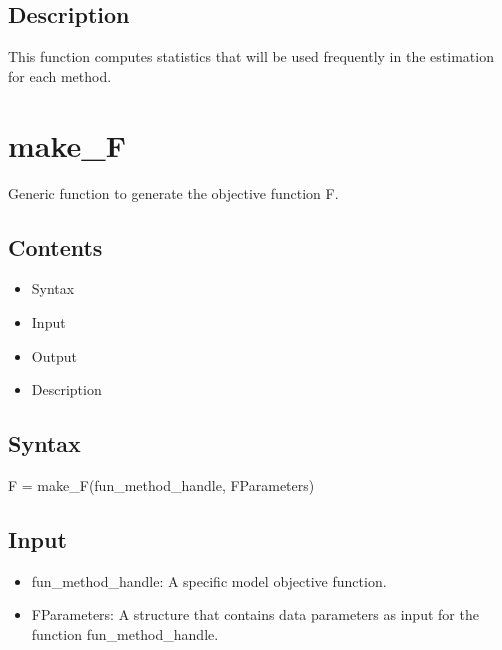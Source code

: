 \documentclass[a4paper,11pt,openany]{memoir}
\begin{document}
\subsection*{Description}

\begin{par}
This function computes statistics that will be used frequently in the estimation for each method.
\end{par} \vspace{1em}

\newpage

\section*{make\_F}

\begin{par}
Generic function to generate the objective function F.
\end{par} \vspace{1em}

\subsection*{Contents}

\begin{itemize}
\setlength{\itemsep}{-1ex}
   \item Syntax
   \item Input
   \item Output
   \item Description
\end{itemize}


\subsection*{Syntax}

\begin{par}
F = make\_F(fun\_method\_handle, FParameters)
\end{par} \vspace{1em}


\subsection*{Input}

\begin{itemize}
\setlength{\itemsep}{-1ex}
   \item fun\_method\_handle: A specific model objective function.
   \item FParameters: A structure that contains data parameters as input for the function fun\_method\_handle.
\end{itemize}
\end{document}
